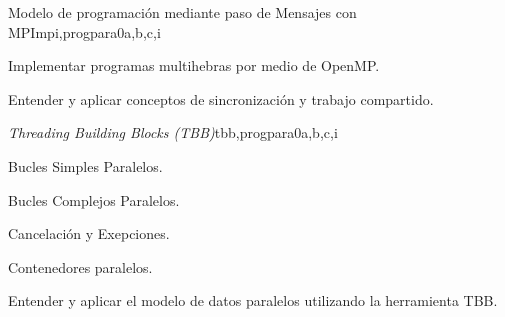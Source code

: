 \begin{syllabus}
\begin{unit}{Modelo de programación mediante paso de Mensajes con MPI}{mpi,progpara}{0}{a,b,c,i}
\begin{unitgoals}
	\item Implementar programas multihebras por medio de OpenMP.
	\item Entender y aplicar conceptos de sincronización y trabajo compartido.
\end{unitgoals}
\end{unit}

\begin{unit}{\textit{Threading Building Blocks (TBB)}}{tbb,progpara}{0}{a,b,c,i}
\begin{topics}
      \item Bucles Simples Paralelos.
      \item Bucles Complejos Paralelos.
      \item Cancelación y Exepciones.
      \item Contenedores paralelos. 
\end{topics}

\begin{unitgoals}
	\item Entender y aplicar el modelo de datos paralelos utilizando la herramienta TBB.
\end{unitgoals}
\end{unit}



\begin{coursebibliography}
\end{coursebibliography}

\end{syllabus}
